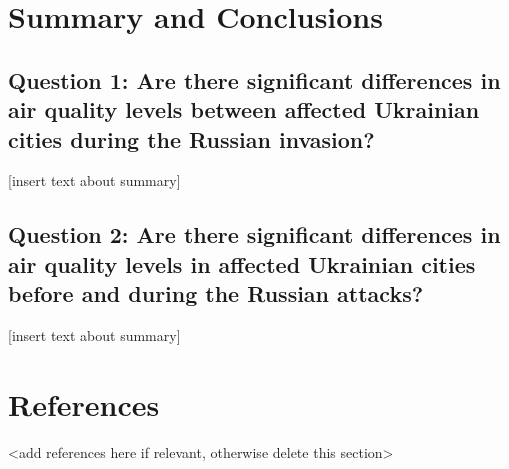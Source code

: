 \documentclass[
  12pt,
]{article}
\begin{document}
\newpage

\hypertarget{summary-and-conclusions}{%
\section{Summary and Conclusions}\label{summary-and-conclusions}}

\hypertarget{question-1-are-there-significant-differences-in-air-quality-levels-between-affected-ukrainian-cities-during-the-russian-invasion-1}{%
\subsection{Question 1: Are there significant differences in air quality
levels between affected Ukrainian cities during the Russian
invasion?}\label{question-1-are-there-significant-differences-in-air-quality-levels-between-affected-ukrainian-cities-during-the-russian-invasion-1}}

{[}insert text about summary{]}

\hypertarget{question-2-are-there-significant-differences-in-air-quality-levels-in-affected-ukrainian-cities-before-and-during-the-russian-attacks-1}{%
\subsection{Question 2: Are there significant differences in air quality
levels in affected Ukrainian cities before and during the Russian
attacks?}\label{question-2-are-there-significant-differences-in-air-quality-levels-in-affected-ukrainian-cities-before-and-during-the-russian-attacks-1}}

{[}insert text about summary{]}

\newpage

\hypertarget{references}{%
\section{References}\label{references}}

\textless add references here if relevant, otherwise delete this
section\textgreater{}
\end{document}
